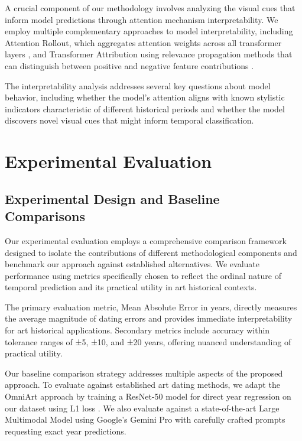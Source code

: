 \documentclass[10pt,twocolumn,letterpaper]{article}
\begin{document}
A crucial component of our methodology involves analyzing the visual cues that inform model predictions through attention mechanism interpretability. We employ multiple complementary approaches to model interpretability, including Attention Rollout, which aggregates attention weights across all transformer layers \cite{Abnar20AttentionRollout}, and Transformer Attribution using relevance propagation methods that can distinguish between positive and negative feature contributions \cite{Chefer21TransformerInterpretability}.

The interpretability analysis addresses several key questions about model behavior, including whether the model's attention aligns with known stylistic indicators characteristic of different historical periods and whether the model discovers novel visual cues that might inform temporal classification.

\section{Experimental Evaluation}

\subsection{Experimental Design and Baseline Comparisons}

Our experimental evaluation employs a comprehensive comparison framework designed to isolate the contributions of different methodological components and benchmark our approach against established alternatives. We evaluate performance using metrics specifically chosen to reflect the ordinal nature of temporal prediction and its practical utility in art historical contexts.

The primary evaluation metric, Mean Absolute Error in years, directly measures the average magnitude of dating errors and provides immediate interpretability for art historical applications. Secondary metrics include accuracy within tolerance ranges of ±5, ±10, and ±20 years, offering nuanced understanding of practical utility.

Our baseline comparison strategy addresses multiple aspects of the proposed approach. To evaluate against established art dating methods, we adapt the OmniArt approach by training a ResNet-50 model for direct year regression on our dataset using L1 loss \cite{Strezoski18}. We also evaluate against a state-of-the-art Large Multimodal Model using Google's Gemini Pro \cite{GeminiTeam23} with carefully crafted prompts requesting exact year predictions.
\end{document}
